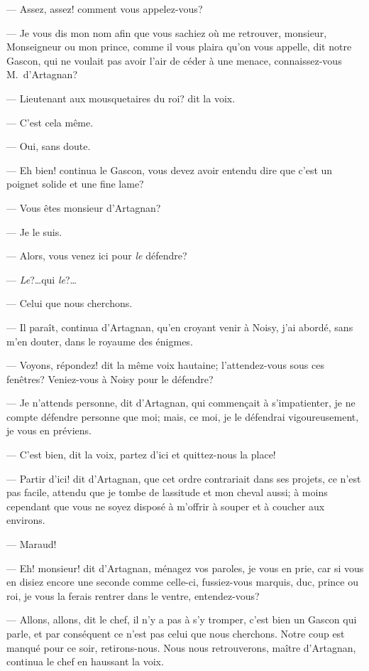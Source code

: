 — Assez, assez! comment vous appelez-vous?

— Je vous dis mon nom afin que vous sachiez où me retrouver, monsieur, Monseigneur ou mon prince, comme il vous plaira qu'on vous appelle, dit notre Gascon, qui ne voulait pas avoir l'air de céder à une menace, connaissez-vous M.~d'Artagnan?

— Lieutenant aux mousquetaires du roi? dit la voix.

— C'est cela même.

— Oui, sans doute.

— Eh bien! continua le Gascon, vous devez avoir entendu dire que c'est un poignet solide et une fine lame?

— Vous êtes monsieur d'Artagnan?

— Je le suis.

— Alors, vous venez ici pour \textit{le} défendre?

— \textit{Le}?\dots qui \textit{le}?\dots

— Celui que nous cherchons.

— Il paraît, continua d'Artagnan, qu'en croyant venir à Noisy, j'ai abordé, sans m'en douter, dans le royaume des énigmes.

— Voyons, répondez! dit la même voix hautaine; l'attendez-vous sous ces fenêtres? Veniez-vous à Noisy pour le défendre?

— Je n'attends personne, dit d'Artagnan, qui commençait à s'impatienter, je ne compte défendre personne que moi; mais, ce moi, je le défendrai vigoureusement, je vous en préviens.

— C'est bien, dit la voix, partez d'ici et quittez-nous la place!

— Partir d'ici! dit d'Artagnan, que cet ordre contrariait dans ses projets, ce n'est pas facile, attendu que je tombe de lassitude et mon cheval aussi; à moins cependant que vous ne soyez disposé à m'offrir à souper et à coucher aux environs.

— Maraud!

— Eh! monsieur! dit d'Artagnan, ménagez vos paroles, je vous en prie, car si vous en disiez encore une seconde comme celle-ci, fussiez-vous marquis, duc, prince ou roi, je vous la ferais rentrer dans le ventre, entendez-vous?

— Allons, allons, dit le chef, il n'y a pas à s'y tromper, c'est bien un Gascon qui parle, et par conséquent ce n'est pas celui que nous cherchons. Notre coup est manqué pour ce soir, retirons-nous. Nous nous retrouverons, maître d'Artagnan, continua le chef en haussant la voix.

